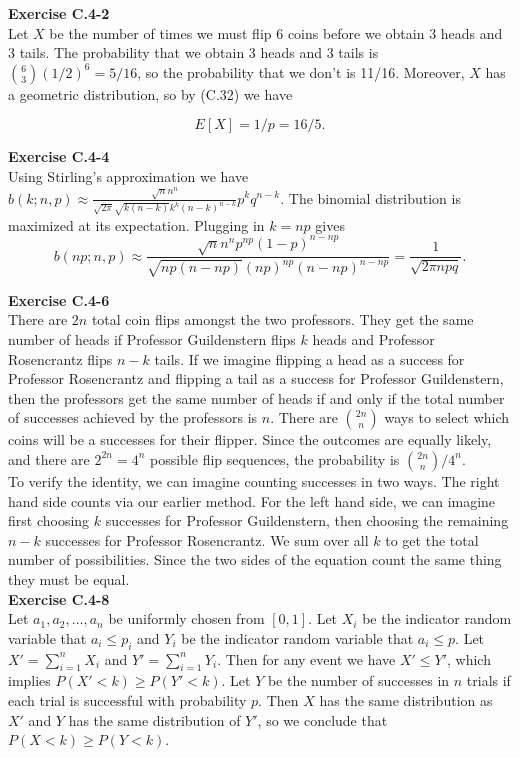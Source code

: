 \documentclass{article}
\begin{document}
\noindent\textbf{Exercise C.4-2}\\

Let $X$ be the number of times we must flip 6 coins before we obtain 3 heads and 3 tails.  The probability that we obtain 3 heads and 3 tails is ${6 \choose 3}(1/2)^6 = 5/16$, so the probability that we don't is 11/16.  Moreover, $X$ has a geometric distribution, so by (C.32) we have

\[ E[X] = 1/p = 16/5.\]

\noindent\textbf{Exercise C.4-4}\\

Using Stirling's approximation we have $b(k;n,p) \approx \frac{\sqrt{n}n^n}{\sqrt{2\pi}\sqrt{k(n-k)}k^k(n-k)^{n-k}}p^kq^{n-k}$.  The binomial distribution is maximized at its expectation.  Plugging in $k=np$ gives 
\[ b(np;n,p) \approx \frac{\sqrt{n}n^np^{np}(1-p)^{n-np}}{\sqrt{np(n-np)}(np)^{np}(n-np)^{n-np}} = \frac{1}{\sqrt{2\pi n p q}}.\]

\noindent\textbf{Exercise C.4-6}\\

There are $2n$ total coin flips amongst the two professors.  They get the same number of heads if Professor Guildenstern flips $k$ heads and Professor Rosencrantz flips $n-k$ tails. If we imagine flipping a head as a success for Professor Rosencrantz and flipping a tail as a success for Professor Guildenstern, then the professors get the same number of heads if and only if the total number of successes achieved by the professors is $n$.  There are ${2n \choose n}$ ways to select which coins will be a successes for their flipper.  Since the outcomes are equally likely, and there are $2^{2n} = 4^n$ possible flip sequences, the probability is ${2n \choose n} / 4^n$.  \\

To verify the identity, we can imagine counting successes in two ways.  The right hand side counts via our earlier method.  For the left hand side, we can imagine first choosing $k$ successes for Professor Guildenstern, then choosing the remaining $n-k$ successes for Professor Rosencrantz.  We sum over all $k$ to get the total number of possibilities.  Since the two sides of the equation count the same thing they must be equal. \\


\noindent\textbf{Exercise C.4-8}\\

Let $a_1, a_2, \ldots, a_n$ be uniformly chosen from $[0,1]$. Let $X_i$ be the indicator random variable that $a_i \leq p_i$ and $Y_i$ be the indicator random variable that $a_i \leq p$.  Let $X' = \sum_{i=1}^n X_i$ and $Y'=\sum_{i=1}^nY_i$.  Then for any event we have $X' \leq Y'$, which implies $P(X' < k) \geq P(Y'<k)$.  Let $Y$ be the number of successes in $n$ trials if each trial is successful with probability $p$.  Then $X$ has the same distribution as $X'$ and $Y$ has the same distribution of $Y'$, so we conclude that $P(X<k) \geq P(Y<k)$. \\
\end{document}
